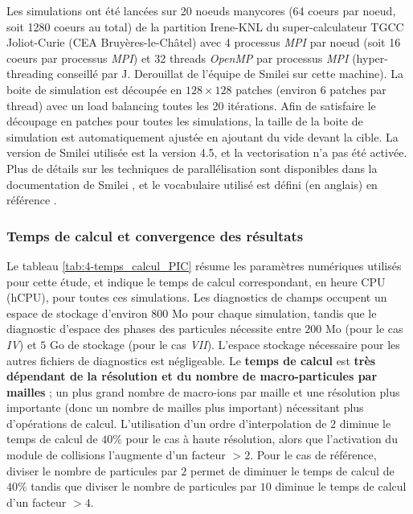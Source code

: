 \begin{refsection}
Les simulations ont été lancées sur 20 noeuds manycores (64 coeurs par noeud, soit 1280 coeurs au total) de la partition Irene-KNL du super-calculateur TGCC Joliot-Curie (CEA Bruyères-le-Châtel) avec 4 processus \textit{MPI} par noeud (soit 16 coeurs par processus \textit{MPI}) et 32 threads \textit{OpenMP} par processus \textit{MPI} (hyper-threading conseillé par J. Derouillat de l'équipe de Smilei sur cette machine). La boite de simulation est découpée en $128 \times 128$ patches (environ 6 patches par thread) avec un load balancing toutes les 20 itérations. Afin de satisfaire le découpage en patches pour toutes les simulations, la taille de la boite de simulation est automatiquement ajustée en ajoutant du vide devant la cible. La version de Smilei utilisée est la version 4.5, et la vectorisation n'a pas été activée. Plus de détails sur les techniques de parallélisation sont disponibles dans la documentation de Smilei \parencite{smilei_web}, et le vocabulaire utilisé est défini (en anglais) en référence \parencite{vocab_parallelisation}. 

\subsubsection{Temps de calcul et convergence des résultats}

Le tableau \ref{tab:4-temps_calcul_PIC} résume les paramètres numériques utilisés pour cette étude, et indique le temps de calcul correspondant, en heure CPU (hCPU), pour toutes ces simulations. Les diagnostics de champs occupent un espace de stockage d'environ $800$ Mo pour chaque simulation, tandis que le diagnostic d'espace des phases des particules nécessite entre $200$ Mo (pour le cas \textit{IV}) et $5$ Go de stockage (pour le cas \textit{VII}). L'espace stockage nécessaire pour les autres fichiers de diagnostics est négligeable.
Le \textbf{temps de calcul} est \textbf{très dépendant de la résolution et du nombre de macro-particules par mailles} ; un plus grand nombre de macro-ions par maille et une résolution plus importante (donc un nombre de mailles plus important) nécessitant plus d'opérations de calcul. L'utilisation d'un ordre d'interpolation de $2$ diminue le temps de calcul de $40 \%$ pour le cas à haute résolution, alors que l'activation du module de collisions l'augmente d'un facteur $>2$. Pour le cas de référence, diviser le nombre de particules par $2$ permet de diminuer le temps de calcul de $40 \%$ tandis que diviser le nombre de particules par $10$ diminue le temps de calcul d'un facteur $> 4$.


\end{refsection}
